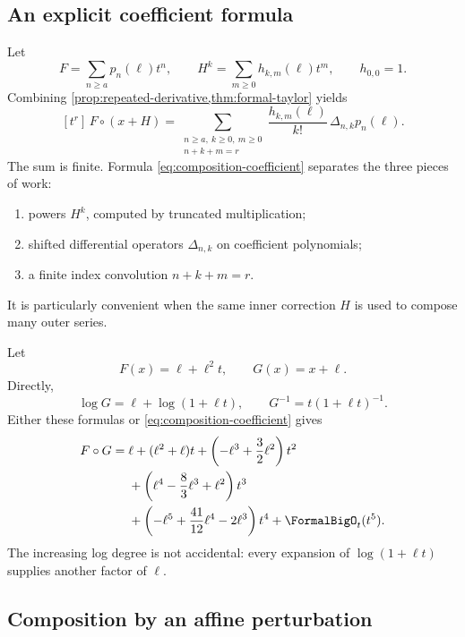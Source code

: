 \documentclass[11pt,oneside]{article}
\numberwithin{equation}{section}
\theoremstyle{definition}
\newcommand{\TransseriesCoefficientOf}[2]{\left[#1\right]\,#2}
\begin{document}
\subsection{An explicit coefficient formula}

Let
\begin{equation}\label{eq:F-H-components}
 F=\sum_{n\ge a}p_n(\ell)t^n,
 \qquad
 H^k=\sum_{m\ge0}h_{k,m}(\ell)t^m,
 \qquad h_{0,0}=1.
\end{equation}
Combining \cref{prop:repeated-derivative,thm:formal-taylor} yields
\begin{equation}\label{eq:composition-coefficient}
\boxed{
  \TransseriesCoefficientOf{t^r}{F\circ(x+H)}
  =\sum_{\substack{n\ge a,\ k\ge0,\ m\ge0\\n+k+m=r}}
    \frac{h_{k,m}(\ell)}{k!}\,\Delta_{n,k}p_n(\ell).
}
\end{equation}
The sum is finite.  Formula \eqref{eq:composition-coefficient} separates the
three pieces of work:
\begin{enumerate}
\item powers \(H^k\), computed by truncated multiplication;
\item shifted differential operators \(\Delta_{n,k}\) on coefficient
  polynomials;
\item a finite index convolution \(n+k+m=r\).
\end{enumerate}
It is particularly convenient when the same inner correction \(H\) is used to
compose many outer series.

\begin{examplebox}
Let
\[
  F(x)=\ell+\ell^2t,
  \qquad G(x)=x+\ell.
\]
Directly,
\[
  \log G=\ell+\log(1+\ell t),
  \qquad G^{-1}=t(1+\ell t)^{-1}.
\]
Either these formulas or \eqref{eq:composition-coefficient} gives
\begin{align*}
 F\circ G={}&\ell+(\ell^2+\ell)t
 +\left(-\ell^3+\frac32\ell^2\right)t^2\\
 &+\left(\ell^4-\frac83\ell^3+\ell^2\right)t^3\\
 &+\left(-\ell^5+\frac{41}{12}\ell^4-2\ell^3\right)t^4
 +\FormalBigO_t(t^5).
\end{align*}
The increasing log degree is not accidental: every expansion of
\(\log(1+\ell t)\) supplies another factor of \(\ell\).
\end{examplebox}

\subsection{Composition by an affine perturbation}
\end{document}
